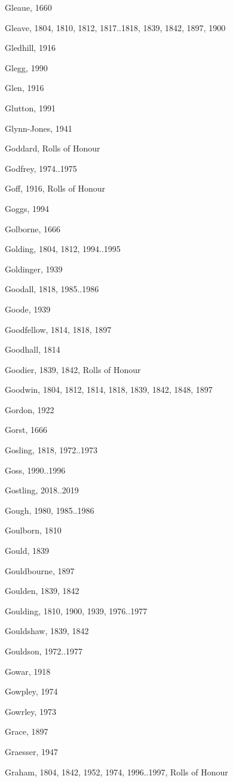 {\begin{theindex}
\item Gleaue, 1660
\item Gleave, 1804, 1810, 1812, 1817..1818, 1839, 1842, 1897, 1900
\item Gledhill, 1916
\item Glegg, 1990
\item Glen, 1916
\item Glutton, 1991
\item Glynn-Jones, 1941
\item Goddard, Rolls of Honour
\item Godfrey, 1974..1975
\item Goff, 1916, Rolls of Honour
\item Goggs, 1994
\item Golborne, 1666
\item Golding, 1804, 1812, 1994..1995
\item Goldinger, 1939
\item Goodall, 1818, 1985..1986
\item Goode, 1939
\item Goodfellow, 1814, 1818, 1897
\item Goodhall, 1814
\item Goodier, 1839, 1842, Rolls of Honour
\item Goodwin, 1804, 1812, 1814, 1818, 1839, 1842, 1848, 1897
\item Gordon, 1922
\item Gorst, 1666
\item Gosling, 1818, 1972..1973
\item Goss, 1990..1996
\item Gostling, 2018..2019
\item Gough, 1980, 1985..1986
\item Goulborn, 1810
\item Gould, 1839
\item Gouldbourne, 1897
\item Goulden, 1839, 1842
\item Goulding, 1810, 1900, 1939, 1976..1977
\item Gouldshaw, 1839, 1842
\item Gouldson, 1972..1977
\item Gowar, 1918
\item Gowpley, 1974
\item Gowrley, 1973
\item Grace, 1897
\item Graesser, 1947
\item Graham, 1804, 1842, 1952, 1974, 1996..1997, Rolls of Honour

\end{theindex}}
